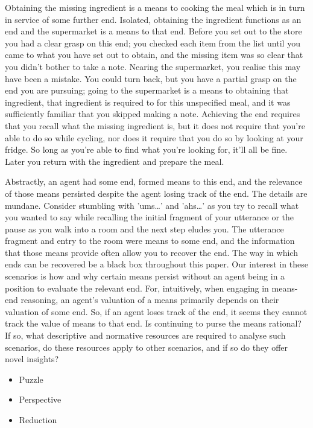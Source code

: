 \documentclass[10pt]{article}
\begin{document}
Obtaining the missing ingredient is a means to cooking the meal which is in turn in service of some further end.
Isolated, obtaining the ingredient functions as an end and the supermarket is a means to that end.
Before you set out to the store you had a clear grasp on this end; you checked each item from the list until you came to what you have set out to obtain, and the missing item was so clear that you didn't bother to take a note.
Nearing the supermarket, you realise this may have been a mistake.
You could turn back, but you have a partial grasp on the end you are pursuing; going to the supermarket is a means to obtaining that ingredient, that ingredient is required to for this unspecified meal, and it was sufficiently familiar that you skipped making a note.
Achieving the end requires that you recall what the missing ingredient is, but it does not require that you're able to do so while cycling, nor does it require that you do so by looking at your fridge.
So long as you're able to find what you're looking for, it'll all be fine.
Later you return with the ingredient and prepare the meal.

Abstractly, an agent had some end, formed means to this end, and the relevance of those means persisted despite the agent losing track of the end.
The details are mundane.
Consider stumbling with 'ums\dots' and 'ahs\dots' as you try to recall what you wanted to say while recalling the initial fragment of your utterance or the pause as you walk into a room and the next step eludes you.
The utterance fragment and entry to the room were means to some end, and the information that those means provide often allow you to recover the end.
The way in which ends can be recovered be a black box throughout this paper.
Our interest in these scenarios is how and why certain means persist without an agent being in a position to evaluate the relevant end.
For, intuitively, when engaging in means-end reasoning, an agent's valuation of a means primarily depends on their valuation of some end.
So, if an agent loses track of the end, it seems they cannot track the value of means to that end.
Is continuing to purse the means rational?
If so, what descriptive and normative resources are required to analyse such scenarios, do these resources apply to other scenarios, and if so do they offer novel insights?

\begin{itemize}
\item Puzzle
\item Perspective
\item Reduction
\end{itemize}
\end{document}
